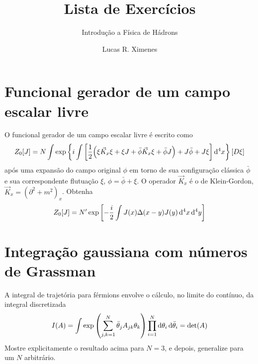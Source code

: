 \documentclass[a4paper, 11pt, oneside]{impression}
\title{Lista de Exercícios} %
\subtitle{Introdução a Física de Hádrons} %
\author{Lucas R. Ximenes} %
\begin{document}
\maketitle

\chapter{Funcional gerador de um campo escalar livre}\label{quest: one}

\begin{exercise}{}
    O funcional gerador de um campo escalar livre é escrito como
        \begin{equation*}
            Z_{0}[J] = N \int \exp\qty{
                i \int \qty[
                    \dfrac{1}{2}\qty(
                        \xi\vec{K}_{x}\xi +
                        \xi J +
                        \bar{\phi}\vec{K}_{x}\xi + 
                        \bar{\phi}J
                    ) + 
                    J\bar{\phi} + 
                    J\xi
                ]\dd[4]{x}
            }[D\xi]
        \end{equation*}
    após uma expansão do campo original $\phi$ em torno de sua configuração clássica $\bar{\phi}$ e sua correspondente flutuação $\xi$, $\phi = \bar{\phi} + \xi$. O operador $\vec{K}_{x}$ é o de Klein-Gordon, $\vec{K}_{x} = (\partial^{2} + m^{2})_{x}$. Obtenha
        \begin{equation*}
            Z_{0}[J] = N'\exp\qty[
                -\dfrac{i}{2}\int J(x)\Delta(x-y)J(y)\dd[4]{x}\dd[4]{y}
            ]
        \end{equation*}
\end{exercise}



\chapter{Integração gaussiana com números de Grassman}\label{quest: two}

\begin{exercise}{}
    A integral de trajetória para férmions envolve o cálculo, no limite do contínuo, da integral discretizada
        \begin{equation*}
            I(A) = \int \exp\qty(\sum_{j,k=1}^{N}\bar{\theta}_{j}A_{jk}\theta_{k})\prod_{i=1}^{N}\dd{\theta_{i}}\dd{\bar{\theta}_{i}} = \text{det}(A)
        \end{equation*}
    Mostre explicitamente o resultado acima para $N = 3$, e depois, generalize para um $N$ arbitrário.
\end{exercise}
\end{document}
